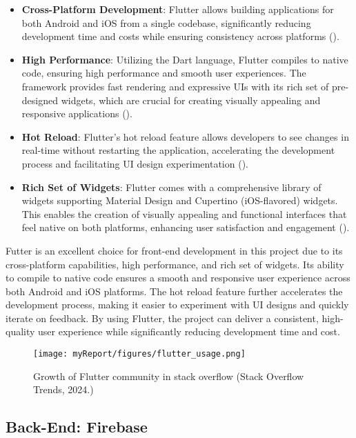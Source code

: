 \begin{itemize}
    \item \textbf{Cross-Platform Development}: Flutter allows building applications for both Android and iOS from a single codebase, significantly reducing development time and costs while ensuring consistency across platforms (\cite{flutter2023}).
    \item \textbf{High Performance}: Utilizing the Dart language, Flutter compiles to native code, ensuring high performance and smooth user experiences. The framework provides fast rendering and expressive UIs with its rich set of pre-designed widgets, which are crucial for creating visually appealing and responsive applications (\cite{flutter_performance}).
    \item \textbf{Hot Reload}: Flutter's hot reload feature allows developers to see changes in real-time without restarting the application, accelerating the development process and facilitating UI design experimentation (\cite{flutter_hot_reload}).
    \item \textbf{Rich Set of Widgets}: Flutter comes with a comprehensive library of widgets supporting Material Design and Cupertino (iOS-flavored) widgets. This enables the creation of visually appealing and functional interfaces that feel native on both platforms, enhancing user satisfaction and engagement (\cite{flutter_widgets}).
\end{itemize}
Futter is an excellent choice for front-end development in this project due to its cross-platform capabilities, high performance, and rich set of widgets. Its ability to compile to native code ensures a smooth and responsive user experience across both Android and iOS platforms. The hot reload feature further accelerates the development process, making it easier to experiment with UI designs and quickly iterate on feedback. By using Flutter, the project can deliver a consistent, high-quality user experience while significantly reducing development time and cost.

\begin{figure}[ht]
        \texttt{[image: myReport/figures/flutter\_usage.png]}
        \caption{Growth of Flutter community in stack overflow (Stack Overflow Trends, 2024.)}
\end{figure}

\subsection{Back-End: Firebase}

